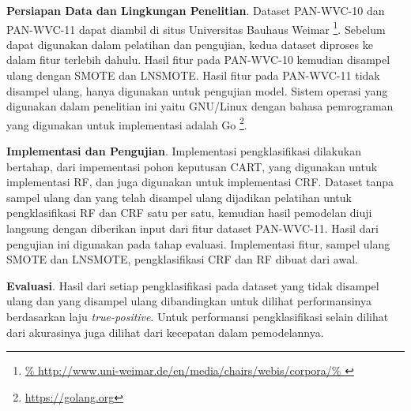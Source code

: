 \textbf{Persiapan Data dan Lingkungan Penelitian}.
Dataset PAN-WVC-10 dan PAN-WVC-11 dapat diambil di situs Universitas
Bauhaus Weimar
\footnote{%
	\RaggedRight\url{%
	http://www.uni-weimar.de/en/media/chairs/webis/corpora/%
}}.
Sebelum dapat digunakan dalam pelatihan dan pengujian, kedua dataset diproses
ke dalam fitur terlebih dahulu.
Hasil fitur pada PAN-WVC-10 kemudian disampel ulang dengan SMOTE dan LNSMOTE.
Hasil fitur pada PAN-WVC-11 tidak disampel ulang, hanya digunakan untuk
pengujian model.
Sistem operasi yang digunakan dalam penelitian ini yaitu GNU/Linux dengan
bahasa pemrograman yang digunakan untuk implementasi adalah Go
\footnote{\RaggedRight\url{https://golang.org}}.

\textbf{Implementasi dan Pengujian}.
Implementasi pengklasifikasi dilakukan bertahap, dari impementasi pohon
keputusan CART, yang digunakan untuk implementasi RF, dan juga
digunakan untuk implementasi CRF.
Dataset tanpa sampel ulang dan yang telah disampel ulang dijadikan
pelatihan untuk pengklasifikasi RF dan CRF satu per satu, kemudian hasil
pemodelan diuji langsung dengan diberikan input dari fitur dataset PAN-WVC-11.
Hasil dari pengujian ini digunakan pada tahap evaluasi.
Implementasi fitur, sampel ulang SMOTE dan LNSMOTE, pengklasifikasi CRF dan RF
dibuat dari awal.

\textbf{Evaluasi}.
Hasil dari setiap pengklasifikasi pada dataset yang tidak disampel ulang dan
yang disampel ulang dibandingkan untuk dilihat performansinya berdasarkan laju
\textit{true-positive}.
Untuk performansi pengklasifikasi selain dilihat dari akurasinya juga dilihat
dari kecepatan dalam pemodelannya.
